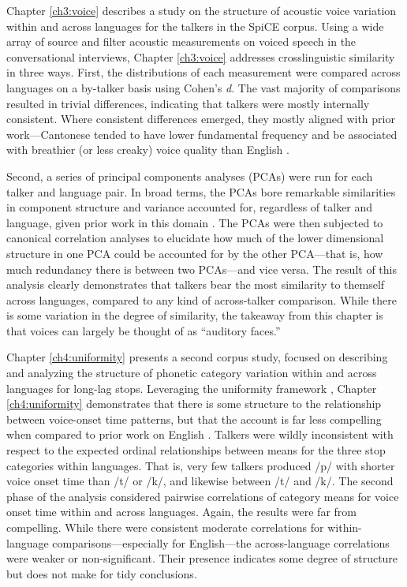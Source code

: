 Chapter \ref{ch3:voice} describes a study on the structure of acoustic voice variation within and across languages for the talkers in the SpiCE corpus. Using a wide array of source and filter acoustic measurements on voiced speech in the conversational interviews, Chapter \ref{ch3:voice} addresses crosslinguistic similarity in three ways. First, the distributions of each measurement were compared across languages on a by-talker basis using Cohen's \textit{d}. The vast majority of comparisons resulted in trivial differences, indicating that talkers were mostly internally consistent. Where consistent differences emerged, they mostly aligned with prior work---Cantonese tended to have lower fundamental frequency and be associated with breathier (or less creaky) voice quality than English \citep{}. 

Second, a series of principal components analyses (PCAs) were run for each talker and language pair. In broad terms, the PCAs bore remarkable similarities in component structure and variance accounted for, regardless of talker and language, given prior work in this domain \citep{}. The PCAs were then subjected to canonical correlation analyses to elucidate how much of the lower dimensional structure in one PCA could be accounted for by the other PCA---that is, how much redundancy there is between two PCAs---and vice versa. The result of this analysis clearly demonstrates that talkers bear the most similarity to themself across languages, compared to any kind of across-talker comparison. While there is some variation in the degree of similarity, the takeaway from this chapter is that voices can largely be thought of as ``auditory faces.''

Chapter \ref{ch4:uniformity} presents a second corpus study, focused on describing and analyzing the structure of phonetic category variation within and across languages for long-lag stops. Leveraging the uniformity framework \citep{chodroff_2017_structure}, Chapter \ref{ch4:uniformity} demonstrates that there is some structure to the relationship between voice-onset time patterns, but that the account is far less compelling when compared to prior work on English \citep{}. Talkers were wildly inconsistent with respect to the expected ordinal relationships between means for the three stop categories within languages. That is, very few talkers produced /p/ with shorter voice onset time than /t/ or /k/, and likewise between /t/ and /k/. The second phase of the analysis considered pairwise correlations of category means for voice onset time within and across languages. Again, the results were far from compelling. While there were consistent moderate correlations for within-language comparisons---especially for English---the across-language correlations were weaker or non-significant. Their presence indicates some degree of structure but does not make for tidy conclusions. 

